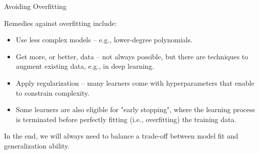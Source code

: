 \begin{vbframe}{Avoiding Overfitting}

Remedies against overfitting include:
\begin{itemize}
  \item Use less complex models -- e.g., lower-degree polynomials. 
  \item Get more, or better, data -- not always possible, but there are 
  techniques to augment existing data, e.g., in deep learning.
  \item Apply regularization -- many learners come with hyperparameters that 
  enable to constrain complexity.
  \item Some learners are also eligible for "early stopping", where the 
  learning process is terminated before perfectly fitting (i.e., overfitting) 
  the training data.
\end{itemize}

\lz

In the end, we will always need to balance a trade-off between model fit 
and generalization ability.

\end{vbframe}





